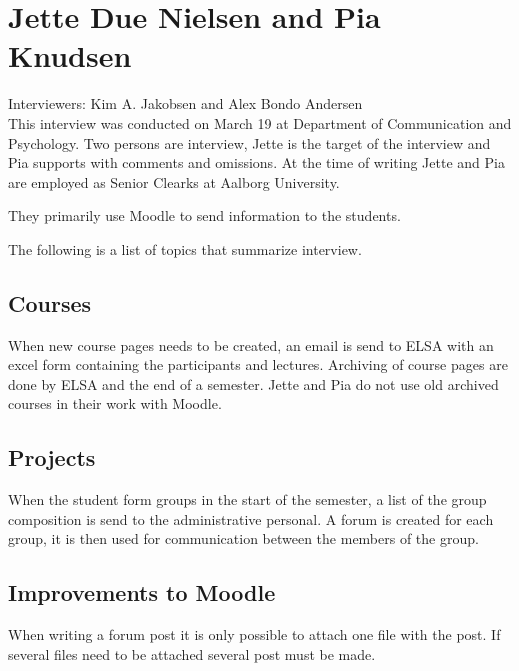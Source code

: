\section{Jette Due Nielsen and Pia Knudsen}
\label{sec:jettePia}
Interviewers: Kim A. Jakobsen and Alex Bondo Andersen\\

This interview was conducted on March 19\ths{} at Department of Communication and Psychology.
Two persons are interview, Jette is the target of the interview and Pia supports with comments and omissions. 
At the time of writing Jette and Pia are employed as Senior Clearks at Aalborg University.

They primarily use Moodle to send information to the students. 

The following is a list of topics that summarize interview.

\subsection*{Courses}
When new course pages needs to be created, an email is send to ELSA with an excel form containing the participants and lectures.
Archiving of course pages are done by ELSA and the end of a semester. 
Jette and Pia do not use old archived courses in their work with Moodle.

\subsection*{Projects}
When the student form groups in the start of the semester, a list of the group composition is send to the administrative personal. 
A forum is created for each group, it is then used for communication between the members of the group.

\subsection*{Improvements to Moodle}
When writing a forum post it is only possible to attach one file with the post. 
If several files need to be attached several post must be made. 
